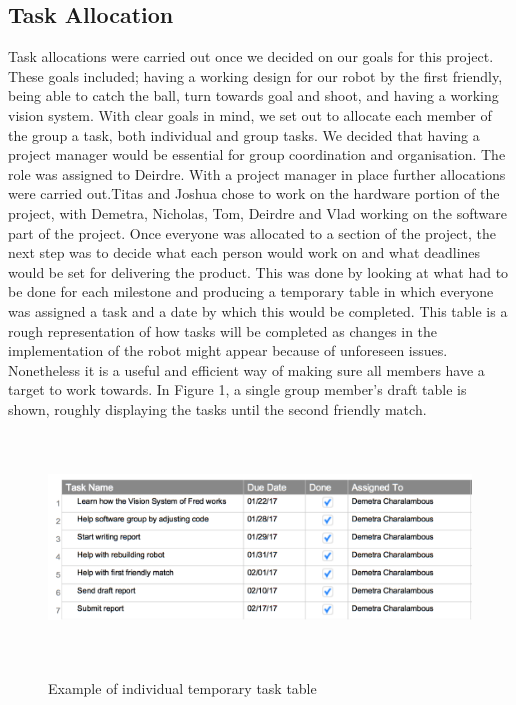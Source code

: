 \documentclass{article}
\begin{document}
\subsection{Task Allocation}
Task allocations were carried out once we decided on our goals for this project. These goals included; having a working design for our robot by the first friendly, being able to catch the ball, turn towards goal and shoot, and having a working vision system.
With clear goals in mind, we set out to allocate each member of the group a task, both individual and group tasks. We decided that having a project manager would be essential for group coordination and organisation. The role was assigned to Deirdre. With a project manager in place further allocations were carried out.Titas and Joshua chose to work on the hardware portion of the project, with Demetra, Nicholas, Tom, Deirdre and Vlad working on the software part of the project. Once everyone was allocated to a section of the project, the next step was to decide what each person would work on and what deadlines would be set for delivering the product. This was done by looking at what had to be done for each milestone and producing a temporary table in which everyone was assigned a task and a date by which this would be completed. This table is a rough representation of how tasks will be completed as changes in the implementation of the robot might appear because of unforeseen issues. Nonetheless it is a useful and efficient way of making sure all members have a target to work towards. In Figure 1, a single group member's draft table is shown, roughly displaying the tasks until the second friendly match.

\begin{figure}[H]
	\centering
	\begin{minipage}{1\textwidth}
		\centering
		\includegraphics[width=16cm, height=6cm]{task_D.png}\\
		\caption{Example of individual temporary task table}
	\end{minipage}%
\end{figure}
\end{document}
